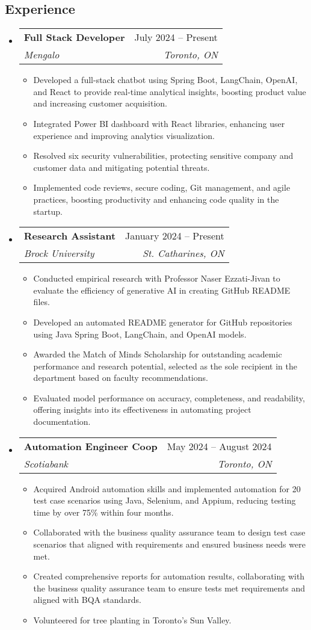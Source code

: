 \documentclass[letterpaper,11pt]{article}
\makeatletter
\newcommand{\resumeItem}[1]{
  \item\small{
    {#1 \vspace{-2pt}}
  }
}
\newcommand{\resumeSubheading}[4]{
  \vspace{-2pt}\item
    \begin{tabular*}{0.97\textwidth}[t]{l@{\extracolsep{\fill}}r}
      \textbf{#1} & #2 \\
      \textit{\small#3} & \textit{\small #4} \\
    \end{tabular*}\vspace{-7pt}
}
\newcommand{\resumeSubHeadingListStart}{\begin{itemize}[leftmargin=0.15in, label={}]}
\newcommand{\resumeSubHeadingListEnd}{\end{itemize}}
\newcommand{\resumeItemListStart}{\begin{itemize}}
\newcommand{\resumeItemListEnd}{\end{itemize}\vspace{-5pt}}
\makeatother
\begin{document}
 \begin{center}

\section{Experience}

 \resumeSubHeadingListStart
    \resumeSubheading
    {Full Stack Developer  }{July 2024 -- Present}
    {Mengalo}{Toronto, ON}
      \resumeItemListStart
        \resumeItem{Developed a full-stack chatbot using Spring Boot, LangChain, OpenAI, and React to provide real-time analytical insights, boosting product value and increasing customer acquisition. }
        \resumeItem{Integrated Power BI dashboard with React libraries, enhancing user experience and improving analytics visualization.}
        \resumeItem{Resolved six security vulnerabilities, protecting sensitive company and customer data and mitigating potential threats.}
        \resumeItem{Implemented code reviews, secure coding, Git management, and agile practices, boosting productivity and enhancing code quality in the startup.}
    \resumeItemListEnd
\resumeSubHeadingListEnd

\resumeSubHeadingListStart
    \resumeSubheading
    {Research Assistant}{January 2024 -- Present}
    {Brock University}{St. Catharines, ON}
      \resumeItemListStart
        \resumeItem{Conducted empirical research with Professor Naser Ezzati-Jivan to evaluate the efficiency of generative AI in creating GitHub README files.}
        \resumeItem {Developed an automated README generator for GitHub repositories using Java Spring Boot, LangChain, and OpenAI models.}
        \resumeItem{Awarded the Match of Minds Scholarship for outstanding academic performance and research potential, selected as the sole recipient in the department based on faculty recommendations.}
        \resumeItem{Evaluated model performance on accuracy, completeness, and readability, offering insights into its effectiveness in automating project documentation.}
    \resumeItemListEnd
\resumeSubHeadingListEnd

  \resumeSubHeadingListStart
    \resumeSubheading
    {Automation Engineer Coop}{May 2024 -- August 2024}
    {Scotiabank}{Toronto, ON}
      \resumeItemListStart
        \resumeItem{Acquired Android automation skills and implemented automation for 20 test case scenarios using Java, Selenium, and Appium, reducing testing time by over 75\% within four months.}
        \resumeItem{Collaborated with the business quality assurance team to design test case scenarios that aligned with requirements and ensured business needs were met.}
        \resumeItem{Created comprehensive reports for automation results, collaborating with the business quality assurance team to ensure tests met requirements and aligned with BQA standards.}
        \resumeItem{Volunteered for tree planting in Toronto's Sun Valley.}
    \resumeItemListEnd
\resumeSubHeadingListEnd


\end{center}
\end{document}
